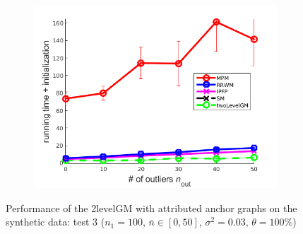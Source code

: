 \begin{figure}[h]
\begin{subfigure}[b]{0.3\textwidth}
			\includegraphics[scale=0.25]{"chapter3/fig/SyntheticTest/descr/Results_v4.3.3/Test1/time_summary_avg10t"} 
		\end{subfigure} 	
	\caption[Performance of the 2levelGM with attributed anchor graphs on the synthetic data (test $3$)]{Performance of the 2levelGM with attributed anchor graphs on the synthetic data: test $3$ ($n_1=100$, $\bar{n}\in[0,50]$, $\sigma^2=0.03$, $\theta=100\%$)}
	\label{fig:synTest3_descr_ver433}
\end{figure}
\vspace{-10pt}
